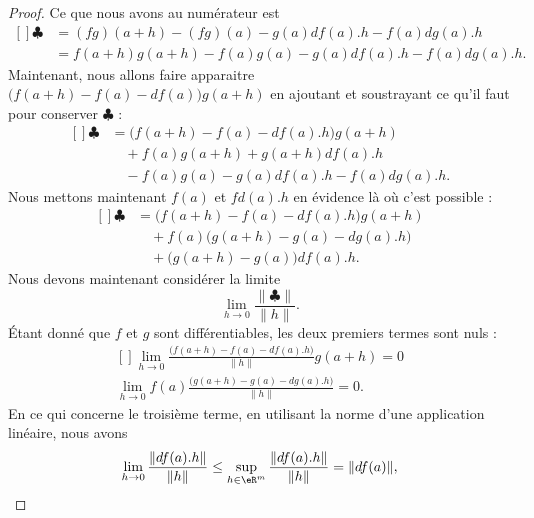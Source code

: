 \begin{proof}
	Ce que nous avons au numérateur est
	\begin{equation}
		\begin{aligned}[]
			\clubsuit & =(fg)(a+h)-(fg)(a)-g(a)df(a).h-f(a)dg(a).h      \\
			          & =f(a+h)g(a+h)-f(a)g(a)-g(a)df(a).h-f(a)dg(a).h.
		\end{aligned}
	\end{equation}
	Maintenant, nous allons faire apparaitre \( \big( f(a+h)-f(a)-df(a) \big)g(a+h)\) en ajoutant et soustrayant ce qu'il faut pour conserver \( \clubsuit\) :
	\begin{equation}
		\begin{aligned}[]
			\clubsuit & =\big( f(a+h)-f(a)-df(a).h \big)g(a+h)   \\
			          & \quad +f(a)g(a+h)+g(a+h)df(a).h          \\
			          & \quad -f(a)g(a)-g(a)df(a).h-f(a)dg(a).h.
		\end{aligned}
	\end{equation}
	Nous mettons maintenant \( f(a)\) et \( fd(a).h\) en évidence là où c'est possible :
	\begin{equation}
		\begin{aligned}[]
			\clubsuit & =\big( f(a+h)-f(a)-df(a).h \big)g(a+h)    \\
			          & \quad+f(a)\big( g(a+h)-g(a)-dg(a).h \big) \\
			          & \quad+\big( g(a+h)-g(a) \big)df(a).h.
		\end{aligned}
	\end{equation}
	Nous devons maintenant considérer la limite
	\begin{equation}
		\lim_{h\to 0}\frac{ \| \clubsuit \| }{ \| h \| }.
	\end{equation}
	Étant donné que \( f\) et \( g\) sont différentiables, les deux premiers termes sont nuls :
	\begin{equation}
		\begin{aligned}[]
			\lim_{h\to 0}\frac{ \big( f(a+h)-f(a)-df(a).h \big)}{\| h \|}g(a+h)=0 \\
			\lim_{h\to 0} f(a)\frac{ \big( g(a+h)-g(a)-dg(a).h \big)}{\| h \|}=0.
		\end{aligned}
	\end{equation}
	En ce qui concerne le troisième terme, en utilisant la norme d'une application linéaire, nous avons
	\begin{equation}
		\lim_{h\to 0} \frac{ \| df(a).h \| }{ \| h \| }\leq\sup_{h\in\eR^m}\frac{ \| df(a).h \| }{ \| h \| }=\| df(a) \|,

\end{equation}
\end{proof}
